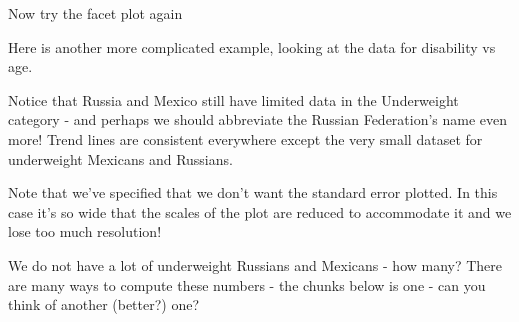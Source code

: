 \documentclass[titlepage]{book}\usepackage{knitr}
\begin{document}
Now  try the facet plot again

\begin{knitrout}
\color{fgcolor}\begin{kframe}
\begin{alltt}
 \hlkwb{<-}  \hlstd{(}  \hlopt{+}
  \hlstd{(} \hlstd{=} \hlstd{)} \hlopt{+}
   \hlopt{~} \hlstd{=}\hlstd{)}
\end{alltt}
\end{kframe}
\end{knitrout}

Here is another more complicated example, looking at the data for disability vs age.

\begin{knitrout}
\color{fgcolor}\begin{kframe}
\begin{alltt}
 \hlkwb{<-}  \hlstd{(}        
 \hlkwb{<-}  \hlopt{+} \hlstd{()}  \hlopt{+} \hlstd{(}   \hlstd{=} \hlstd{)}
 \hlkwb{<-}  \hlopt{+} \hlopt{~}
\end{alltt}
\end{kframe}
\end{knitrout}
 Notice that Russia and Mexico still have limited data in the Underweight category - and perhaps we should abbreviate the Russian Federation's name even more! Trend lines are consistent everywhere except the very small dataset for underweight Mexicans and Russians.

Note that we've specified that we don't want the standard error plotted. In this case it's so wide that the scales of the plot are reduced to accommodate it and we lose too much resolution!

We do not have a lot of underweight Russians and Mexicans - how many? There are many ways to compute these numbers -  the chunks below is one - can you think of another (better?) one?
\end{document}

